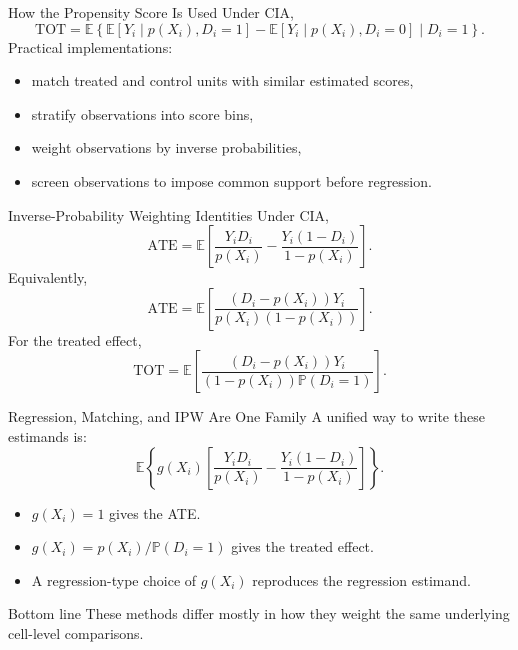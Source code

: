 \documentclass[11pt,aspectratio=169]{beamer}
\newcommand{\E}{\mathbb{E}}
\newcommand{\Prob}{\mathbb{P}}
\newcommand{\ATE}{\mathrm{ATE}}
\newcommand{\TOT}{\mathrm{TOT}}
\newcommand{\derivbutton}[1]{\vspace{0.4em}\hfill\hyperlink{app:#1}{\beamerbutton{Appendix details}}}
\begin{document}
\begin{frame}{How the Propensity Score Is Used}
  Under CIA,
  \[
    \TOT
    =
    \E\left\{
      \E[Y_i \mid p(X_i),D_i=1]-\E[Y_i \mid p(X_i),D_i=0]
      \mid D_i=1
    \right\}.
  \]
  Practical implementations:
  \begin{itemize}
    \item match treated and control units with similar estimated scores,
    \item stratify observations into score bins,
    \item weight observations by inverse probabilities,
    \item screen observations to impose common support before regression.
  \end{itemize}
\end{frame}

\begin{frame}{Inverse-Probability Weighting Identities}
  \hypertarget{main:ipw}{}
  Under CIA,
  \[
    \ATE
    =
    \E\left[
      \frac{Y_iD_i}{p(X_i)}
      -
      \frac{Y_i(1-D_i)}{1-p(X_i)}
    \right].
  \]
  Equivalently,
  \[
    \ATE
    =
    \E\left[
      \frac{(D_i-p(X_i))Y_i}{p(X_i)(1-p(X_i))}
    \right].
  \]
  For the treated effect,
  \[
    \TOT
    =
    \E\left[
      \frac{(D_i-p(X_i))Y_i}{(1-p(X_i))\Prob(D_i=1)}
    \right].
  \]
  \derivbutton{ipw-proof}
\end{frame}

\begin{frame}{Regression, Matching, and IPW Are One Family}
  A unified way to write these estimands is:
  \[
    \E\left\{
      g(X_i)\left[
        \frac{Y_iD_i}{p(X_i)}
        -
        \frac{Y_i(1-D_i)}{1-p(X_i)}
      \right]
    \right\}.
  \]
  \begin{itemize}
    \item \(g(X_i)=1\) gives the ATE.
    \item \(g(X_i)=p(X_i)/\Prob(D_i=1)\) gives the treated effect.
    \item A regression-type choice of \(g(X_i)\) reproduces the regression estimand.
  \end{itemize}
  \begin{block}{Bottom line}
    These methods differ mostly in how they weight the same underlying cell-level comparisons.
  \end{block}
\end{frame}
\end{document}
